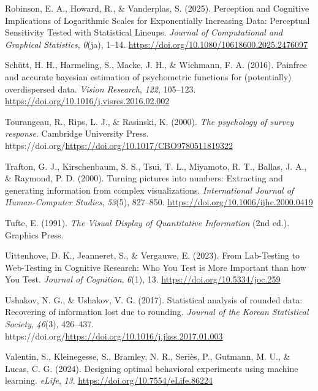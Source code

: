 \documentclass[
  10pt,
]{article}
\newlength{\cslhangindent}
\newenvironment{CSLReferences}[2] %
 {\begin{list}{}{%
  \setlength{\itemindent}{0pt}
  \setlength{\leftmargin}{0pt}
  \setlength{\parsep}{0pt}
  \ifodd #1
   \setlength{\leftmargin}{\cslhangindent}
   \setlength{\itemindent}{-1\cslhangindent}
  \fi
  \setlength{\itemsep}{#2\baselineskip}}}
 {\end{list}}
\begin{document}
\begin{CSLReferences}{1}{0}
Robinson, E. A., Howard, R., \& Vanderplas, S. (2025). Perception and
{Cognitive Implications} of {Logarithmic Scales} for {Exponentially
Increasing Data}: {Perceptual Sensitivity Tested} with {Statistical
Lineups}. \emph{Journal of Computational and Graphical Statistics},
\emph{0}(ja), 1--14. \url{https://doi.org/10.1080/10618600.2025.2476097}

Schütt, H. H., Harmeling, S., Macke, J. H., \& Wichmann, F. A. (2016).
Painfree and accurate bayesian estimation of psychometric functions for
(potentially) overdispersed data. \emph{Vision Research}, \emph{122},
105--123. \url{https://doi.org/10.1016/j.visres.2016.02.002}

Tourangeau, R., Rips, L. J., \& Rasinski, K. (2000). \emph{The
psychology of survey response}. Cambridge University Press.
https://doi.org/\url{https://doi.org/10.1017/CBO9780511819322}

Trafton, G. J., Kirschenbaum, S. S., Tsui, T. L., Miyamoto, R. T.,
Ballas, J. A., \& Raymond, P. D. (2000). Turning pictures into numbers:
Extracting and generating information from complex visualizations.
\emph{International Journal of Human-Computer Studies}, \emph{53}(5),
827--850. \url{https://doi.org/10.1006/ijhc.2000.0419}

Tufte, E. (1991). \emph{The {Visual} {Display} of {Quantitative}
{Information}} (2nd ed.). Graphics Press.

Uittenhove, D. K., Jeanneret, S., \& Vergauwe, E. (2023). From
{Lab-Testing} to {Web-Testing} in {Cognitive Research}: {Who You Test}
is {More Important} than how {You Test}. \emph{Journal of Cognition},
\emph{6}(1), 13. \url{https://doi.org/10.5334/joc.259}

Ushakov, N. G., \& Ushakov, V. G. (2017). Statistical analysis of
rounded data: {Recovering} of information lost due to rounding.
\emph{Journal of the Korean Statistical Society}, \emph{46}(3),
426--437.
https://doi.org/\url{https://doi.org/10.1016/j.jkss.2017.01.003}

Valentin, S., Kleinegesse, S., Bramley, N. R., Seriès, P., Gutmann, M.
U., \& Lucas, C. G. (2024). Designing optimal behavioral experiments
using machine learning. \emph{{eLife}}, \emph{13}.
\url{https://doi.org/10.7554/eLife.86224}


\end{CSLReferences}
\end{document}
